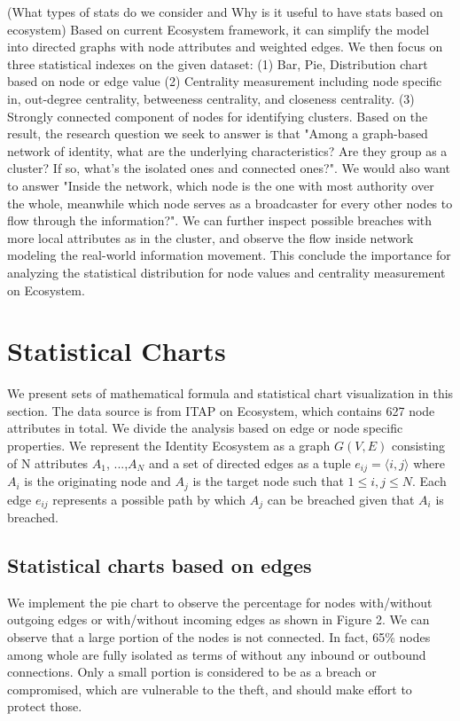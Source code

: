 \documentclass[letterpaper, 10 pt, conference]{ieeeconf}  %
\begin{document}
(What types of stats do we consider and Why is it useful to have stats based on ecosystem)
Based on current Ecosystem framework, it can simplify the model into directed graphs with node attributes and weighted edges. We then focus on three statistical indexes on the given dataset: (1) Bar, Pie, Distribution chart based on node or edge value (2) Centrality measurement including node specific in, out-degree centrality, betweeness centrality, and closeness centrality. (3) Strongly  connected  component of nodes for identifying clusters. Based on the result, the research question we seek to answer is that "Among a graph-based network of identity, what are the underlying characteristics? Are they group as a cluster? If so, what's the isolated ones and connected ones?". We would also want to answer "Inside the network, which node is the one with most authority over the whole, meanwhile which node serves as a broadcaster for every other nodes to flow through the information?". We can further inspect possible breaches with more local attributes as in the cluster, and observe the flow inside network modeling the real-world information movement. This conclude the importance for analyzing the statistical distribution for node values and centrality measurement on Ecosystem.

\section{Statistical Charts}
We present sets of mathematical formula and statistical chart visualization in this section. The data source is from ITAP on Ecosystem, which contains 627 node attributes in total. We divide the analysis based on edge or node specific properties. We represent the Identity Ecosystem as a graph $G(V, E)$ consisting of N attributes $A_{1}$, ...,$A_{N}$ and a set of directed edges as a tuple
$e_{ij} = \langle i, j \rangle$ where $A_{i}$
is the originating node and $A_{j}$
is the target node such that $1 \leq i, j \leq N$. Each edge $e_{ij}$ represents a possible path by which $A_{j}$ can be breached given that $A_{i}$ is breached.

\subsection{Statistical charts based on edges}
We implement the pie chart to observe the percentage for nodes with/without outgoing edges or with/without incoming edges as shown in Figure 2. We can observe that a large portion of the nodes is not connected. In fact, 65\% nodes among whole are fully isolated as terms of without any inbound or outbound connections. Only a small portion is considered to be as a breach or compromised, which are vulnerable to the theft, and should make effort to protect those. 
\end{document}
